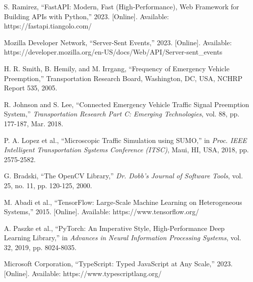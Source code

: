\documentclass[conference]{IEEEtran}
\begin{document}
\begin{thebibliography}{20}
S. Ramirez, ``FastAPI: Modern, Fast (High-Performance), Web Framework for Building APIs with Python,'' 2023. [Online]. Available: https://fastapi.tiangolo.com/

Mozilla Developer Network, ``Server-Sent Events,'' 2023. [Online]. Available: https://developer.mozilla.org/en-US/docs/Web/API/Server-sent\_events

H. R. Smith, B. Hemily, and M. Irrgang, ``Frequency of Emergency Vehicle Preemption,'' Transportation Research Board, Washington, DC, USA, NCHRP Report 535, 2005.

R. Johnson and S. Lee, ``Connected Emergency Vehicle Traffic Signal Preemption System,'' \textit{Transportation Research Part C: Emerging Technologies}, vol. 88, pp. 177-187, Mar. 2018.

P. A. Lopez et al., ``Microscopic Traffic Simulation using SUMO,'' in \textit{Proc. IEEE Intelligent Transportation Systems Conference (ITSC)}, Maui, HI, USA, 2018, pp. 2575-2582.

G. Bradski, ``The OpenCV Library,'' \textit{Dr. Dobb's Journal of Software Tools}, vol. 25, no. 11, pp. 120-125, 2000.

M. Abadi et al., ``TensorFlow: Large-Scale Machine Learning on Heterogeneous Systems,'' 2015. [Online]. Available: https://www.tensorflow.org/

A. Paszke et al., ``PyTorch: An Imperative Style, High-Performance Deep Learning Library,'' in \textit{Advances in Neural Information Processing Systems}, vol. 32, 2019, pp. 8024-8035.

Microsoft Corporation, ``TypeScript: Typed JavaScript at Any Scale,'' 2023. [Online]. Available: https://www.typescriptlang.org/

\end{thebibliography}
\end{document}
